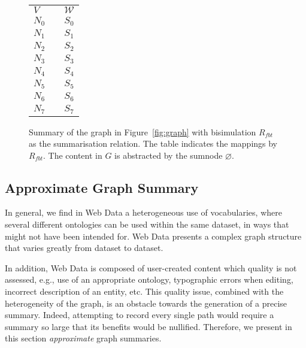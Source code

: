 \begin{figure}
	\centering
	\begin{minipage}{.75\textwidth}
		\resizebox{\textwidth}{!}{
			
		}
	\end{minipage}
	\quad
	\begin{minipage}[h]{.2\textwidth}
		\centering
		\caption*{$R_{fbt}\left(V, \mathcal{W}\right)$}
		\begin{tabular}{lc@{\hs}l}
			\toprule
			$V$ & \phantom{a} & $\mathcal{W}$ \\
			\cmidrule{1-1} \cmidrule{3-3}
			$N_0$ & \phantom{a} & $S_0$ \\
			$N_1$ & \phantom{a} & $S_1$ \\
			$N_2$ & \phantom{a} & $S_2$ \\
			$N_3$ & \phantom{a} & $S_3$ \\
			$N_4$ & \phantom{a} & $S_4$ \\
			$N_5$ & \phantom{a} & $S_5$ \\
			$N_6$ & \phantom{a} & $S_6$ \\
			$N_7$ & \phantom{a} & $S_7$ \\
			\bottomrule
		\end{tabular}
	\end{minipage}
	\caption{Summary of the graph in Figure~\ref{fig:graph} with bisimulation $R_{fbt}$ as the summarisation relation. The table indicates the mappings by $R_{fbt}$. The content in $G$ is abstracted by the sumnode $\varnothing$.}
	\label{fig:fbb-summary}
\end{figure}

\subsection{Approximate Graph Summary}
\label{sec:approximate}

In general, we find in Web Data a heterogeneous use of vocabularies, where several different ontologies can be used within the same dataset, in ways that might not have been intended for. Web Data presents a complex graph structure that varies greatly from dataset to dataset.

In addition, Web Data is composed of user-created content which quality is not assessed, e.g., use of an appropriate ontology, typographic errors when editing, incorrect description of an entity, etc. This quality issue, combined with the heterogeneity of the graph, is an obstacle towards the generation of a precise summary. Indeed, attempting to record every single path would require a summary so large that its benefits would be nullified. Therefore, we present in this section \emph{approximate} graph summaries.

